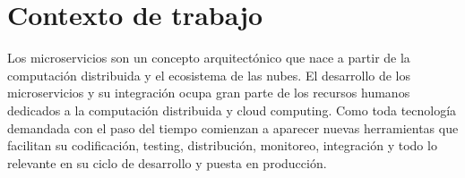 \section{Contexto de trabajo}

Los microservicios son un concepto arquitectónico que nace a partir de la computación distribuida y el ecosistema de las nubes.
El desarrollo de los microservicios y su integración ocupa gran parte de los recursos humanos dedicados a la computación distribuida y cloud computing. Como toda tecnología demandada con el paso del tiempo comienzan a aparecer nuevas herramientas que facilitan su codificación, testing, distribución, monitoreo, integración y todo lo relevante en su ciclo de desarrollo y puesta en producción.\par
